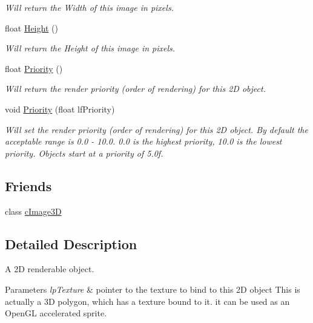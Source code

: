\begin{DoxyCompactItemize}
\begin{DoxyCompactList}\small\item\em Will return the Width of this image in pixels. \end{DoxyCompactList}\item 
\hypertarget{classc_image_adfccfa4a2893b805bf231d5039c27f05}{
float \hyperlink{classc_image_adfccfa4a2893b805bf231d5039c27f05}{Height} ()}
\label{classc_image_adfccfa4a2893b805bf231d5039c27f05}

\begin{DoxyCompactList}\small\item\em Will return the Height of this image in pixels. \end{DoxyCompactList}\item 
\hypertarget{classc_image_a180170d55759e2e832a8e2eb059052e1}{
float \hyperlink{classc_image_a180170d55759e2e832a8e2eb059052e1}{Priority} ()}
\label{classc_image_a180170d55759e2e832a8e2eb059052e1}

\begin{DoxyCompactList}\small\item\em Will return the render priority (order of rendering) for this 2D object. \end{DoxyCompactList}\item 
\hypertarget{classc_image_aa806d16e1ace073a52a40175ba9d52ff}{
void \hyperlink{classc_image_aa806d16e1ace073a52a40175ba9d52ff}{Priority} (float lfPriority)}
\label{classc_image_aa806d16e1ace073a52a40175ba9d52ff}

\begin{DoxyCompactList}\small\item\em Will set the render priority (order of rendering) for this 2D object. By default the acceptable range is 0.0 -\/ 10.0. 0.0 is the highest priority, 10.0 is the lowest priority. Objects start at a priority of 5.0f. \end{DoxyCompactList}\end{DoxyCompactItemize}
\subsection*{Friends}
\begin{DoxyCompactItemize}
\item 
\hypertarget{classc_image_ac3e18951e9137b17e506e36253a11cb7}{
class \hyperlink{classc_image_ac3e18951e9137b17e506e36253a11cb7}{cImage3D}}
\label{classc_image_ac3e18951e9137b17e506e36253a11cb7}

\end{DoxyCompactItemize}


\subsection{Detailed Description}
A 2D renderable object. 


\begin{DoxyParams}{Parameters}
{\em lpTexture} & pointer to the texture to bind to this 2D object This is actually a 3D polygon, which has a texture bound to it. it can be used as an OpenGL accelerated sprite. \\
\hline
\end{DoxyParams}
